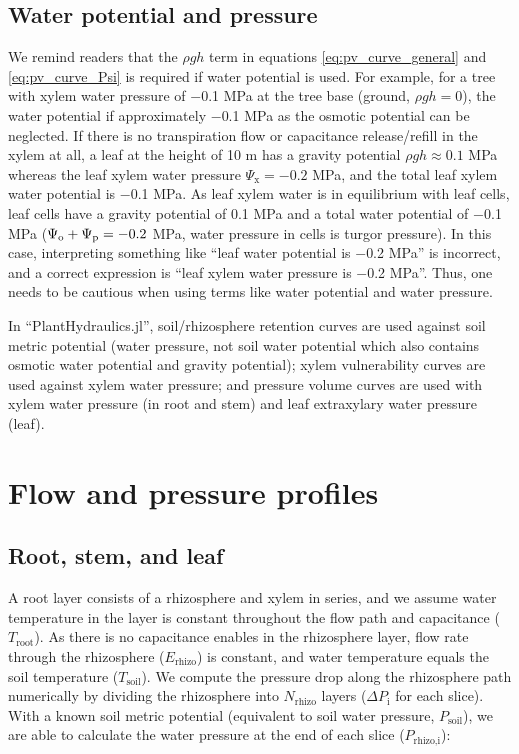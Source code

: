 \documentclass[twoside,10pt]{report}
\begin{document}
\subsection{Water potential and pressure}
\par We remind readers that the $\rho gh$ term in equations \ref{eq:pv_curve_general} and \ref{eq:pv_curve_Psi} is required if water potential is used. For example, for a tree with xylem water pressure of $-$0.1 MPa at the tree base (ground, $\rho gh = 0$), the water potential if approximately $-$0.1 MPa as the osmotic potential can be neglected. If there is no transpiration flow or capacitance release/refill in the xylem at all, a leaf at the height of 10 m has a gravity potential $\rho gh \approx 0.1$ MPa whereas the leaf xylem water pressure $\Psi_\text{x} = -0.2$ MPa, and the total leaf xylem water potential is $-$0.1 MPa. As leaf xylem water is in equilibrium with leaf cells, leaf cells have a gravity potential of 0.1 MPa and a total water potential of $-$0.1 MPa ($\Psi_\text{o} + \Psi_\text{p} = -0.2$ MPa, water pressure in cells is turgor pressure). In this case, interpreting something like ``leaf water potential is $-$0.2 MPa'' is incorrect, and a correct expression is ``leaf xylem water pressure is $-$0.2 MPa''. Thus, one needs to be cautious when using terms like water potential and water pressure.

\par In ``PlantHydraulics.jl'', soil/rhizosphere retention curves are used against soil metric potential (water pressure, not soil water potential which also contains osmotic water potential and gravity potential); xylem vulnerability curves are used against xylem water pressure; and pressure volume curves are used with xylem water pressure (in root and stem) and leaf extraxylary water pressure (leaf).




\section{Flow and pressure profiles}

\subsection{Root, stem, and leaf}
\par A root layer consists of a rhizosphere and xylem in series, and we assume water temperature in the layer is constant throughout the flow path and capacitance ($T_\text{root}$). As there is no capacitance enables in the rhizosphere layer, flow rate through the rhizosphere ($E_\text{rhizo}$) is constant, and water temperature equals the soil temperature ($T_\text{soil}$). We compute the pressure drop along the rhizosphere path numerically by dividing the rhizosphere into $N_\text{rhizo}$ layers ($\Delta P_\text{i}$ for each slice). With a known soil metric potential (equivalent to soil water pressure, $P_\text{soil}$), we are able to calculate the water pressure at the end of each slice ($P_\text{rhizo,i}$):
\end{document}

